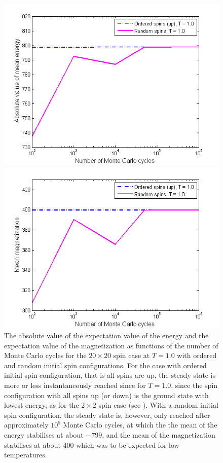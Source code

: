 \begin{figure}[H]
\centering
\begin{minipage}{.5\textwidth}
  \centering
  \includegraphics[width=1\linewidth]{Figures/Energy_1_0.png}
\end{minipage}%
\begin{minipage}{.5\textwidth}
  \centering
  \includegraphics[width=1\linewidth]{Figures/Magnetization_1_0.png}
\end{minipage}
\caption{
The absolute value of the expectation value of the energy and the expectation value of the magnetization as functions of the number of Monte Carlo cycles for the $20\times 20$ spin case at $T = 1.0$ with ordered and random initial spin configurations.
For the case with ordered initial spin configuration, that is all spins are up, the steady state is more or less instantaneously reached since for $T = 1.0$, since the spin configuration with all spins up (or down) is the ground state with lowest energy, as for the $2\times 2$ spin case (see ).
With a random initial spin configuration, the steady state is, however, only reached after approximately $10^5$ Monte Carlo cycles, at which the the mean of the energy stabilises at about $-799$, and the mean of the magnetization stabilises at about $400$ which was to be expected for low temperatures. 
}
\label{fig:ResultsMCcyclesExpectationValue1}
\end{figure}

